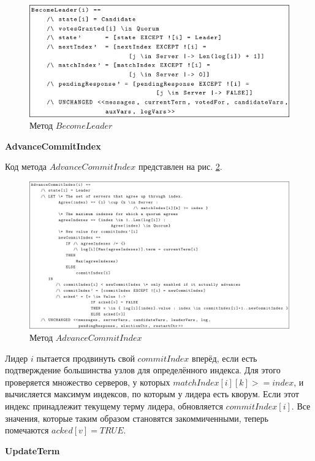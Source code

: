 \begin{figure}
  \centering
  \includegraphics[scale=0.4]{inc/tla-06-become-leader.png}
  \caption{Метод $BecomeLeader$}
  \label{fig:tla-06-become-leader}
\end{figure}

\textbf{AdvanceCommitIndex}

Код метода $AdvanceCommitIndex$ представлен на рис. \ref{fig:tla-06-advance-commit-index}.

\begin{figure}
  \centering
  \includegraphics[scale=0.4]{inc/tla-06-advance-commit-index.png}
  \caption{Метод $AdvanceCommitIndex$}
  \label{fig:tla-06-advance-commit-index}
\end{figure}

Лидер $i$ пытается продвинуть свой $commitIndex$ вперёд, если есть подтверждение
большинства узлов для определённого индекса. Для этого проверяется множество
серверов, у которых $matchIndex[i][k] >= index$, и вычисляется максимум индексов,
по которым у лидера есть кворум. Если этот индекс принадлежит текущему терму лидера,
обновляется $commitIndex[i]$. Все значения, которые таким образом становятся
закоммиченными, теперь помечаются $acked[v] = TRUE$.

\textbf{UpdateTerm}

